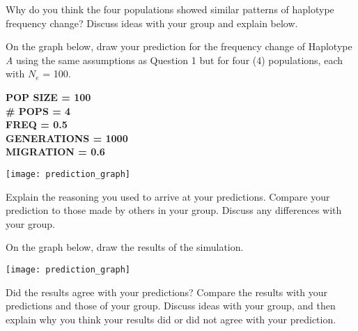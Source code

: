 \documentclass[11pt, addpoints]{exam}
\begin{document}
\begin{questions}
\question
Why do you think the four populations showed similar
patterns of haplotype frequency change? Discuss ideas with your group
and explain below.



\newpage

\question
On the graph below, draw your prediction for the frequency
change of Haplotype \emph{A} using the same assumptions as Question 1
but for four (4) populations, each with $N_e$ = 100.

\ifprintanswers
	{\bfseries %
	POP SIZE = 100\\
	\# POPS = 4\\
	FREQ = 0.5\\
	GENERATIONS = 1000\\
	MIGRATION = 0.6 }\vspace*{16\baselineskip}
\else
	\begin{center}
		\texttt{[image: prediction\_graph]}
	\end{center}
\fi

\question[1] 
Explain the reasoning you used to arrive at your predictions. 
Compare your prediction to those made by others in your
group. Discuss any differences with your group.

\newpage

\question 
On the graph below, draw the results of the simulation.

\begin{center}
	\texttt{[image: prediction\_graph]}
\end{center}

\question 
Did the results agree with your predictions? Compare the
results with your predictions and those of your group. Discuss ideas
with your group, and then explain why you think your results did or did
not agree with your prediction.




\end{questions}
\end{document}
